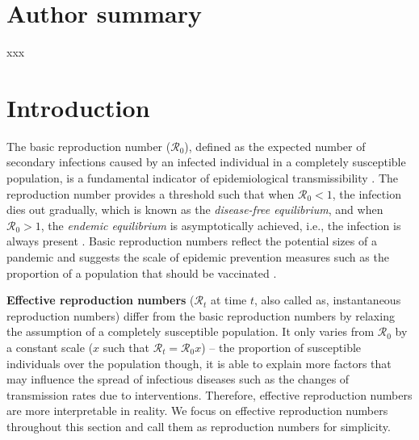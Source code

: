 \documentclass[10pt,letterpaper]{article}
\def\calR{\mathcal{R}}
\begin{document}
\section*{Author summary}
xxx

\linenumbers

\section*{Introduction}
\label{sec:intro}

The basic reproduction number ($\calR_0$), defined as the expected number of secondary infections caused by an infected individual in a completely susceptible population, is a fundamental indicator of epidemiological transmissibility \cite{diekmann1990definition,dietz1993estimation,fine1993herd}. The reproduction number provides a threshold such that when $\calR_0<1$, the infection dies out gradually, which is known as the \textit{disease-free equilibrium}, and when $\calR_0>1$, the \textit{endemic equilibrium} is asymptotically achieved, i.e., the infection is always present \cite{diekmann1990definition,delamater2019complexity,brauer2019mathematical}. Basic reproduction numbers reflect the potential sizes of a pandemic and suggests the scale of epidemic prevention measures such as the proportion of a population that should be vaccinated \cite{anderson1982directly,anderson1985vaccination,heffernan2005perspectives,delamater2019complexity}. 

\textbf{Effective reproduction numbers} ($\calR_t$ at time $t$, also called as, instantaneous reproduction numbers) differ from the basic reproduction numbers by relaxing the assumption of a completely susceptible population. It only varies from $\calR_0$ by a constant scale ($x$ such that $\calR_t=\calR_0 x$) -- the proportion of susceptible individuals over the population though, it is able to explain more factors that may influence the spread of infectious diseases such as the changes of transmission rates due to interventions. Therefore, effective reproduction numbers are more interpretable in reality. We focus on effective reproduction numbers throughout this section and call them as reproduction numbers for simplicity.
\end{document}
